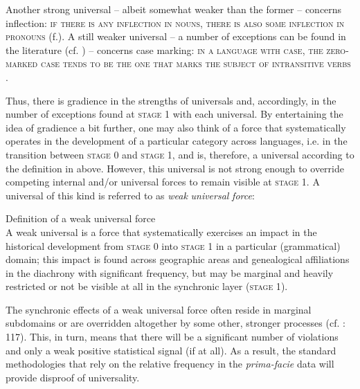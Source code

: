 \documentclass[output=paper]{langsci/langscibook}
\begin{document}
Another strong universal – albeit somewhat weaker than the former – concerns inflection: \textsc{if there is any inflection in nouns, there is also some inflection in pronouns} (\citealt{Moravcsik1993,PlankEtAl2002f}f.). A still weaker universal – a number of exceptions can be found in the literature (cf. \citealt{Handschuh2014}) – concerns case marking: \textsc{in a language with case, the zero-marked case tends to be the one that marks the subject of intransitive verbs} \citep[95]{Greenberg1963}. 

Thus, there is gradience in the strengths of universals and, accordingly, in the number of exceptions found at \textsc{stage 1} with each universal. By entertaining the idea of gradience a bit further, one may also think of a force that systematically operates in the development of a particular category across languages, i.e. in the transition between \textsc{stage} 0 and \textsc{stage} 1, and is, therefore, a universal according to the definition in  above. However, this universal is not strong enough to override competing internal and/or universal forces to remain visible at \textsc{stage} 1. A universal of this kind is referred to as \textit{weak} \textit{universal} \textit{force}\textsc{:} 

\ea\label{ex:serzant:2}
Definition of a weak universal force\\
A weak universal is a force that systematically exercises an impact in the historical development from \textsc{stage 0} into \textsc{stage 1} in a particular (grammatical) domain; this impact is found across geographic areas and genealogical affiliations in the diachrony with significant frequency, but may be marginal and heavily restricted or not be visible at all in the synchronic layer (\textsc{stage 1}).
\z

The synchronic effects of a weak universal force often reside in marginal subdomains or are overridden altogether by some other, stronger processes (cf. \citealt{Bickel2014}: 117). This, in turn, means that there will be a significant number of violations and only a weak positive statistical signal (if at all). As a result, the standard methodologies that rely on the relative frequency in the \textit{prima-facie} data will provide disproof of universality. 
\end{document}
